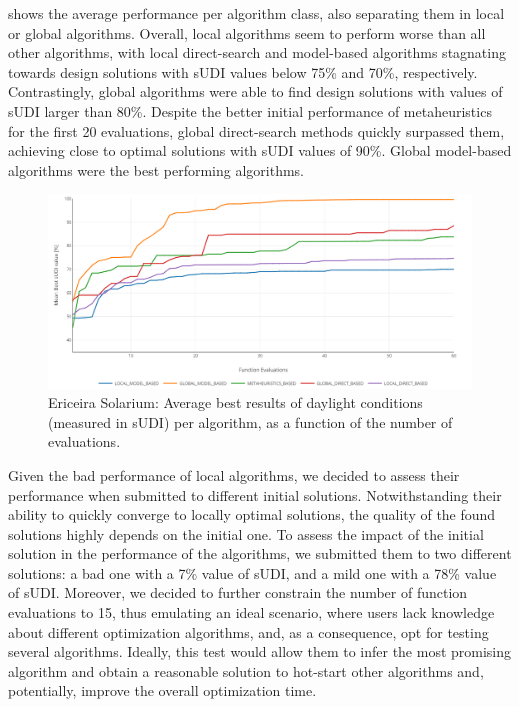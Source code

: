  shows the average performance per algorithm class, also separating them in local or global algorithms. Overall, local algorithms seem to perform worse than all other algorithms, with local direct-search and model-based algorithms stagnating towards design solutions with sUDI values below 75\% and 70\%, respectively. Contrastingly, global algorithms were able to find design solutions with values of sUDI larger than 80\%. Despite the better initial performance of metaheuristics for the first 20 evaluations, global direct-search methods quickly surpassed them, achieving close to optimal solutions with \ac{sUDI} values of 90\%. Global model-based algorithms were the best performing algorithms. 

\begin{figure}[htbp]
	\centering
	\includegraphics[width=1\textwidth]{Images/Evaluation/Ericeira_results_ph1_per_class.PNG}
	\caption[Ericeira Solarium: Average best results of daylight conditions (measured in \ac{sUDI}) per algorithm's class]{Ericeira Solarium: Average best results of daylight conditions (measured in \ac{sUDI}) per algorithm, as a function of the number of evaluations.}
	\label{fig:phase1results}
\end{figure}

Given the bad performance of local algorithms, we decided to assess their performance when submitted to different initial solutions. Notwithstanding their ability to quickly converge to locally optimal solutions, the quality of the found solutions highly depends on the initial one. To assess the impact of the initial solution in the performance of the algorithms, we submitted them to two different solutions: a bad one with a 7\% value of \ac{sUDI}, and a mild one with a 78\% value of \ac{sUDI}. Moreover, we decided to further constrain the number of function evaluations to 15, thus emulating an ideal scenario, where users lack knowledge about different optimization algorithms, and, as a consequence, opt for testing several algorithms. Ideally, this test would allow them to infer the most promising algorithm and obtain a reasonable solution to hot-start other algorithms and, potentially, improve the overall optimization time.

